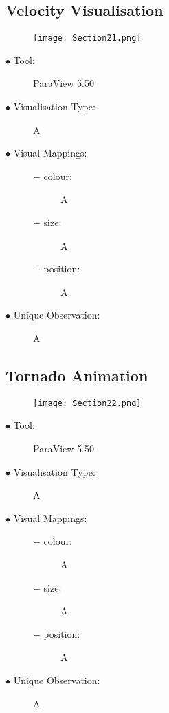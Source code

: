 \documentclass{article}
\begin{document}
\subsection{Velocity Visualisation}
\begin{figure}[h]
	\centering
	\texttt{[image: Section21.png]}
\end{figure}
\begin{description}
	\item[$\bullet$ Tool:] ParaView 5.50
	\item[$\bullet$ Visualisation Type:] A
	\item[$\bullet$ Visual Mappings:] \hfill
		\begin{description}
			\item[$-$ colour:] A
			\item[$-$ size:] A
			\item[$-$ position:] A
		\end{description}
	\item[$\bullet$ Unique Observation:] A
\end{description}
\newpage

\subsection{Tornado Animation}
\begin{figure}[h]
	\centering
	\texttt{[image: Section22.png]}
\end{figure}
\begin{description}
	\item[$\bullet$ Tool:] ParaView 5.50
	\item[$\bullet$ Visualisation Type:] A
	\item[$\bullet$ Visual Mappings:] \hfill
		\begin{description}
			\item[$-$ colour:] A
			\item[$-$ size:] A
			\item[$-$ position:] A
		\end{description}
	\item[$\bullet$ Unique Observation:] A
\end{description}
\newpage
\end{document}
